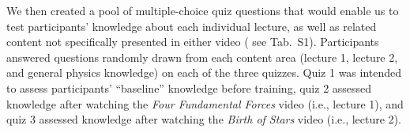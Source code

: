 \documentclass[10pt]{article}
\newcommand{\questions}{S1}
\begin{document}

We then created a pool of
multiple-choice quiz questions that would enable us to test participants'
knowledge about each individual lecture, as well as related content not
specifically presented in either video ( see Tab.~\questions). Participants answered
questions randomly drawn from each content area (lecture 1, lecture 2, and
general physics knowledge) on each of the three quizzes. Quiz 1 was intended to
assess participants' ``baseline'' knowledge before training, quiz 2 assessed knowledge
after watching the \textit{Four Fundamental Forces} video (i.e., lecture 1),
and quiz 3 assessed knowledge after watching the \textit{Birth of Stars} video
(i.e., lecture 2).
\end{document}
